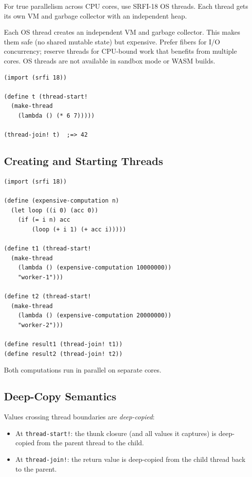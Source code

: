 For true parallelism across CPU cores, use SRFI-18 OS threads. Each thread gets its own VM and garbage collector with an independent heap.

\begin{warning}
Each OS thread creates an independent VM and garbage collector. This makes them safe (no shared mutable state) but expensive. Prefer fibers for I/O concurrency; reserve threads for CPU-bound work that benefits from multiple cores. OS threads are not available in sandbox mode or WASM builds.
\end{warning}

\begin{lstlisting}
(import (srfi 18))

(define t (thread-start!
  (make-thread
    (lambda () (* 6 7)))))

(thread-join! t)  ;=> 42
\end{lstlisting}

\subsection{Creating and Starting Threads}

\begin{lstlisting}
(import (srfi 18))

(define (expensive-computation n)
  (let loop ((i 0) (acc 0))
    (if (= i n) acc
        (loop (+ i 1) (+ acc i)))))

(define t1 (thread-start!
  (make-thread
    (lambda () (expensive-computation 10000000))
    "worker-1")))

(define t2 (thread-start!
  (make-thread
    (lambda () (expensive-computation 20000000))
    "worker-2")))

(define result1 (thread-join! t1))
(define result2 (thread-join! t2))
\end{lstlisting}

Both computations run in parallel on separate cores.

\subsection{Deep-Copy Semantics}

Values crossing thread boundaries are \emph{deep-copied}:

\begin{itemize}
    \item At \texttt{thread-start!}: the thunk closure (and all values it captures) is deep-copied from the parent thread to the child.
    \item At \texttt{thread-join!}: the return value is deep-copied from the child thread back to the parent.
\end{itemize}

